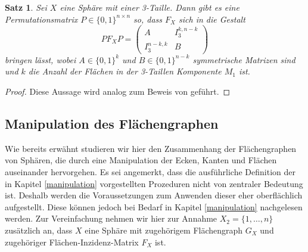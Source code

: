 \documentclass[12pt,titlepage,twoside,cleardoublepage]{article}
\theoremstyle{nummermitklammern}
\newtheorem{satz}[temp]{Satz}
\newtheorem{satz}[zahl]{Satz}
\numberwithin{equation}{section}
\begin{document}
\begin{satz}
Sei $X$ eine Sphäre mit einer 3-Taille. Dann gibt es eine Permutationsmatrix $P\in \{0,1\}^{n \times n}$ so, dass $F_X$ sich in die Gestalt 
\[
PF_XP=
\left( 
\begin{array}{c|c} 
  A & I^{k,n-k}_3 \\ 
  \hline 
  I^{n-k,k}_3 & B 
\end{array} 
\right)
\] 
bringen lässt, wobei $A\in \{0,1\}^{k}$ und $B\in \{0,1\}^{n-k}$ symmetrische Matrizen sind und $k$ die Anzahl der Flächen in der 3-Taillen Komponente $M_1$ ist.
\end{satz}
\begin{proof}
Diese Aussage wird analog zum Beweis von  geführt.
\end{proof}

\subsection{Manipulation des Flächengraphen }
Wie bereits erwähnt studieren wir hier den Zusammenhang der Flächengraphen von Sphären, die durch eine Manipulation der Ecken, Kanten und Flächen auseinander hervorgehen. Es sei angemerkt, dass die ausführliche Definition der in Kapitel \ref{manipulation} vorgestellten Prozeduren nicht von zentraler Bedeutung ist. Deshalb werden die Voraussetzungen zum Anwenden dieser eher oberflächlich aufgestellt. Diese können jedoch bei Bedarf in Kapitel \ref{manipulation} nachgelesen werden. Zur Vereinfachung nehmen wir hier zur Annahme $X_2  =\{1,\ldots,n\}$ zusätzlich an, dass $X$ eine Sphäre mit zugehörigem Flächengraph $G_X$ und zugehöriger Flächen-Inzidenz-Matrix $F_X$ ist.
\end{document}
